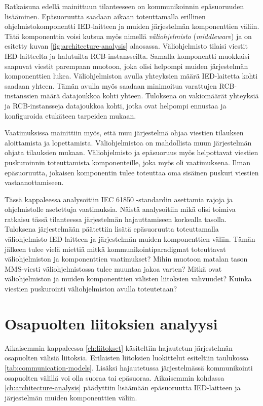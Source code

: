 Ratkaisuna edellä mainittuun tilanteeseen on kommunikoinnin epäsuoruuden lisääminen. Epäsuoruutta saadaan aikaan toteuttamalla erillinen ohjelmistokomponentti IED-laitteen ja muiden järjestelmän komponenttien väliin. Tätä komponenttia voisi kutsua myös nimellä \emph{väliohjelmisto} (\emph{middleware}) ja on esitetty kuvan \ref{fig:architecture-analysis} alaosassa. Väliohjelmisto tilaisi viestit IED-laitteelta ja halutuilta RCB-instansseilta. Samalla komponentti muokkaisi saapuvat viestit parempaan muotoon, joka olisi helpompi muiden järjestelmän komponenttien lukea. Väliohjelmiston avulla yhteyksien määrä IED-laitetta kohti saadaan yhteen. Tämän avulla myös saadaan minimoitua varattujen RCB-instanssien määrä datajoukkoa kohti yhteen. Tuloksena on vakiomäärät yhteyksiä ja RCB-instansseja datajoukkoa kohti, jotka ovat helpompi ennustaa ja konfiguroida etukäteen tarpeiden mukaan.

Vaatimuksissa mainittiin myös, että muu järjestelmä ohjaa viestien tilauksen aloittamista ja lopettamista. Väliohjelmistoa on mahdollista muun järjestelmän ohjata tilauksien mukaan. Väliohjelmisto ja epäsuoruus myös helpottavat viestien puskuroinnin toteuttamista komponenteille, joka myös oli vaatimuksena. Ilman epäsuoruutta, jokaisen komponentin tulee toteuttaa oma sisäinen puskuri viestien vastaanottamiseen.

Tässä kappaleessa analysoitiin IEC 61850 -standardin asettamia rajoja ja ohjelmistolle asetettuja vaatimuksia. Näistä analysoitiin mikä olisi toimiva ratkaisu tässä tilanteessa järjestelmän hajauttamiseen korkealla tasolla. Tuloksena järjestelmään päätettiin lisätä epäsuoruutta toteuttamalla väliohjelmisto IED-laitteen ja järjestelmän muiden komponenttien väliin. Tämän jälkeen tulee vielä miettiä mitkä kommunikointiparadigmat toteuttavat väliohjelmiston ja komponenttien vaatimukset? Mihin muotoon matalan tason MMS-viesti väliohjelmistossa tulee muuntaa jakoa varten? Mitkä ovat väliohjelmiston ja muiden komponenttien välisten liitoksien vahvuudet? Kuinka viestien puskurointi väliohjelmiston avulla toteutetaan?


\section{Osapuolten liitoksien analyysi}
Aikaisemmin kappaleessa \ref{ch:liitokset} käsiteltiin hajautetun järjestelmän osapuolten välisiä liitoksia. Erilaisten liitoksien luokittelut esiteltiin taulukossa \ref{tab:communication-models}. Lisäksi hajautetussa järjestelmässä kommunikointi osapuolten välillä voi olla suoraa tai epäsuoraa. Aikaisemmin kohdassa \ref{ch:architecture-analysis} päädyttiin lisäämään epäsuoruutta IED-laitteen ja järjestelmän muiden komponenttien väliin.

